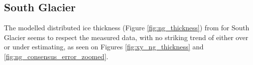 \documentclass[a4, 12pt]{article}
\newcommand{\fref}[1]{(Figure \ref{#1})}
\begin{document}
\subsection{South Glacier}
The modelled distributed ice thickness \fref{fig:ng_thickness} from \citet{farinotti2019consensus} for South Glacier seems to respect the measured data, with no striking trend of either over or under estimating, as seen on Figures \ref{fig:xy_ng_thickness} and \ref{fig:ng_consensus_error_zoomed}.
\begin{figure}[h!]
\centering
{}
\end{figure}
\end{document}
